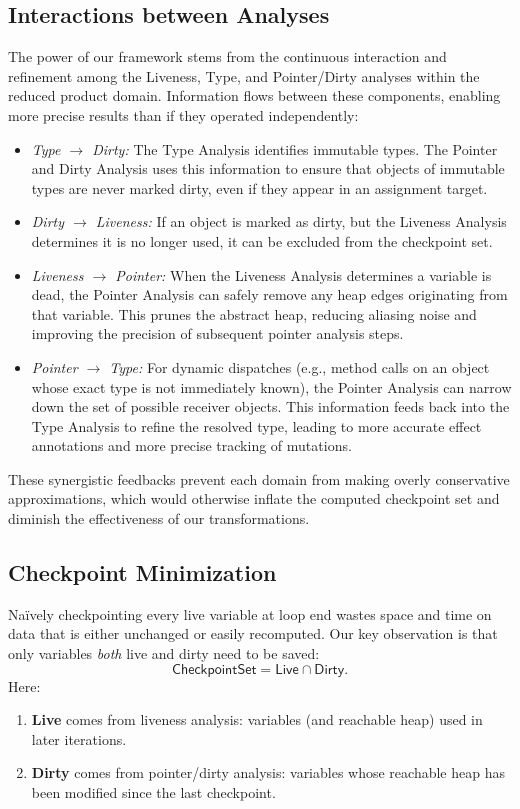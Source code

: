 \subsection{Interactions between Analyses}

The power of our framework stems from the continuous interaction and refinement among the Liveness, Type, and Pointer/Dirty analyses within the reduced product domain. Information flows between these components, enabling more precise results than if they operated independently:

\begin{itemize}
    \item \emph{Type $\rightarrow$ Dirty:} The Type Analysis identifies immutable types. The Pointer and Dirty Analysis uses this information to ensure that objects of immutable types are never marked dirty, even if they appear in an assignment target.
    \item \emph{Dirty $\rightarrow$ Liveness:} If an object is marked as dirty, but the Liveness Analysis determines it is no longer used, it can be excluded from the checkpoint set.
    \item \emph{Liveness $\rightarrow$ Pointer:} When the Liveness Analysis determines a variable is dead, the Pointer Analysis can safely remove any heap edges originating from that variable. This prunes the abstract heap, reducing aliasing noise and improving the precision of subsequent pointer analysis steps.
    \item \emph{Pointer $\rightarrow$ Type:} For dynamic dispatches (e.g., method calls on an object whose exact type is not immediately known), the Pointer Analysis can narrow down the set of possible receiver objects. This information feeds back into the Type Analysis to refine the resolved type, leading to more accurate effect annotations and more precise tracking of mutations.
\end{itemize}
These synergistic feedbacks prevent each domain from making overly conservative approximations, which would otherwise inflate the computed checkpoint set and diminish the effectiveness of our transformations.

\subsection{Checkpoint Minimization}

Naïvely checkpointing every live variable at loop end wastes space and time on data that is either unchanged or easily recomputed. Our key observation is that only variables \emph{both} live and dirty need to be saved:
\[
\mathsf{CheckpointSet} = \mathsf{Live} \cap \mathsf{Dirty}.
\]
Here:
\begin{enumerate}
    \item \textbf{Live} comes from liveness analysis: variables (and reachable heap) used in later iterations.
    \item \textbf{Dirty} comes from pointer/dirty analysis: variables whose reachable heap has been modified since the last checkpoint.
\end{enumerate}

